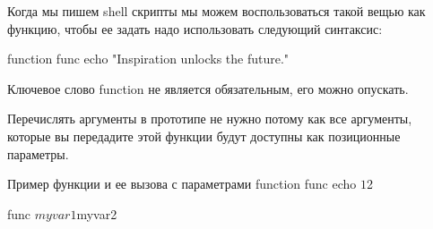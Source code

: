 Когда мы пишем shell скрипты мы можем воспользоваться такой вещью как функцию, чтобы ее задать надо использовать следующий синтаксис:

\begin{shCode}{ }
	function func {
		echo "Inspiration unlocks the future."
	}
\end{shCode}

Ключевое слово function не является обязательным, его можно опускать.

Перечислять аргументы в прототипе не нужно потому как все аргументы, которые вы передадите этой функции будут доступны как позиционные параметры.

\begin{shCode}{Пример функции и ее вызова с параметрами}
		function func {
			echo $1 $2
		}
	
		func $myvar1 $myvar2
\end{shCode}